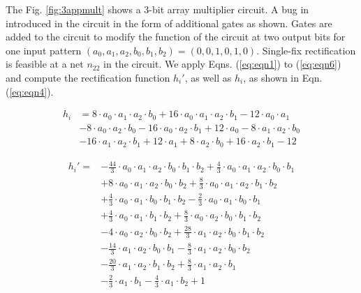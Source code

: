 \begin{Example}
The Fig. \ref{fig:3appmult} shows a 3-bit array multiplier circuit. A
bug in introduced in the circuit in the form of additional gates as
shown. Gates are added to the circuit to modify the function of the
circuit at two output bits for one input pattern
$(a_0,a_1,a_2,b_0,b_1,b_2)=(0,0,1,0,1,0)$. Single-fix
rectification is feasible at a net $n_{22}$ in the 
circuit. We apply Eqns. (\ref{eq:eqn1}) to (\ref{eq:eqn6}) and compute
the rectification function $h_i'$, as well as $h_i$, as shown in
Eqn. (\ref{eq:eqn4}).  
{\small
\begin{equation}
    \begin{split}
h_i & = 8\cdot a_0\cdot a_1\cdot a_2\cdot b_0
+16\cdot a_0\cdot a_1\cdot a_2\cdot b_1
-12\cdot a_0\cdot a_1 \\
& -8\cdot a_0\cdot a_2\cdot b_0 
 -16\cdot a_0\cdot a_2\cdot b_1 
 +12\cdot a_0-8\cdot a_1\cdot a_2\cdot b_0 \\
& -16\cdot a_1\cdot a_2\cdot b_1 
+12\cdot a_1+8\cdot a_2\cdot b_0
+16\cdot a_2\cdot b_1
-12        
    \end{split}
    \nonumber
\end{equation}

\begin{equation}
    \begin{split}
h_i' = & -\frac{44}{3}\cdot a_0\cdot a_1\cdot a_2\cdot b_0\cdot b_1\cdot b_2+
\frac{4}{3}\cdot a_0\cdot a_1\cdot a_2\cdot b_0\cdot b_1 \\
& +8\cdot a_0\cdot a_1\cdot a_2\cdot b_0\cdot b_2
+\frac{8}{3}\cdot a_0\cdot a_1\cdot a_2\cdot b_1\cdot b_2 \\
& +\frac{4}{3} \cdot a_0\cdot a_1\cdot b_0\cdot b_1\cdot b_2
-\frac{2}{3}\cdot a_0\cdot a_1\cdot b_0\cdot b_1 \\
&+\frac{4}{3}\cdot a_0\cdot a_1\cdot b_1\cdot b_2
+\frac{8}{3}\cdot a_0\cdot a_2\cdot b_0\cdot b_1\cdot b_2 \\
& -4\cdot a_0\cdot a_2\cdot b_0\cdot b_2 
+\frac{28}{3}\cdot a_1\cdot a_2\cdot b_0\cdot b_1\cdot b_2 \\
& -\frac{14}{3}\cdot a_1\cdot a_2\cdot b_0\cdot b_1
-\frac{8}{3}\cdot a_1\cdot a_2\cdot b_0\cdot b_2 \\
&-\frac{20}{3}\cdot a_1\cdot a_2\cdot b_1\cdot b_2
+\frac{8}{3}\cdot a_1\cdot a_2\cdot b_1 \\
&-\frac{2}{3}\cdot a_1\cdot b_1 
-\frac{4}{3}\cdot a_1\cdot b_2
+1        
\end{split}
\nonumber
\end{equation}
}


\end{Example}

